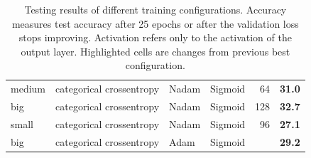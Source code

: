 \documentclass[11pt, twocolumn]{article}
\begin{document}
\begin{table}[]
\begin{tabular}{@{}llllrr@{}}
        \cellcolor[HTML]{FFCCC9}medium & categorical crossentropy                    & Nadam                         & Sigmoid                         & \multicolumn{1}{r|}{\cellcolor[HTML]{FFCCC9}64}                         & \textbf{31.0}                              \\
        big                            & categorical crossentropy                    & Nadam                         & Sigmoid                         & \multicolumn{1}{r|}{\cellcolor[HTML]{9AFF99}128}                        & \textbf{32.7}                              \\
        \cellcolor[HTML]{FFCCC9}small  & categorical crossentropy                    & Nadam                         & Sigmoid                         & \multicolumn{1}{r|}{96}                                                 & \textbf{27.1}                              \\
        big                            & categorical crossentropy                    & \cellcolor[HTML]{FFCCC9}Adam  & Sigmoid                         & \multicolumn{1}{r|}{\cellcolor[HTML]{FFFFFF}{\color[HTML]{000000} 128}} & \textbf{29.2}                              \\
        \bottomrule
    \end{tabular}
    \caption{Testing results of different training configurations. Accuracy measures test accuracy after 25 epochs or after the validation loss stops improving. Activation refers only to the activation of the output layer. Highlighted cells are changes from previous best configuration. }
    \label{tab:results}
\end{table}
\end{document}
